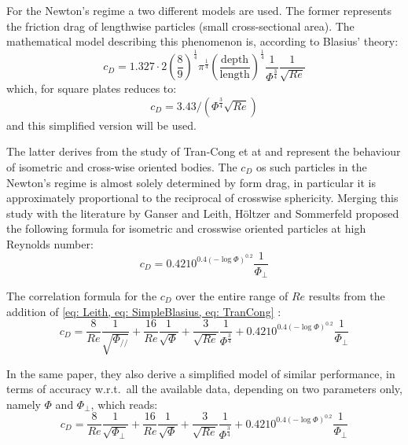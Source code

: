 		For the Newton's regime a two different models are used. The former
		represents the friction drag of lengthwise particles (small cross-sectional area). The mathematical model describing this phenomenon is, according to Blasius' theory:
		\begin{equation}
			c_D = 1.327 \cdot 2 \left(\frac{8}{9}\right)^{\frac{1}{4}} \pi^{\frac{1}{4}} \left(\frac{\text{depth}}{\text{length}}\right)^{\frac{1}{4}} \frac{1}{\Phi^{\frac{3}{4}}} \frac{1}{\sqrt{Re}}
			\label{eq: Blasius}
		\end{equation}
		which, for square plates reduces to:
		\begin{equation}
			c_D = 3.43 / (\Phi^{\frac{3}{4}} \sqrt{Re})
			\label{eq: SimpleBlasius}
		\end{equation}
		and this simplified version will be used.
		
		The latter derives from the study of Tran-Cong et at \cite{TranCongEtAl-2004} and represent the behaviour of isometric and cross-wise oriented bodies. The $ c_D $ os such particles in the Newton's regime is almost solely determined by form drag, in particular it is approximately proportional to the reciprocal of crosswise sphericity. Merging this study with the literature by Ganser and Leith, H\"{o}ltzer and Sommerfeld proposed the following formula for isometric and crosswise oriented particles at high Reynolds number:
		\begin{equation}
			c_D = 0.4210^{0.4(-\log \Phi)^{0.2}} \frac{1}{\Phi_{\perp}}
			\label{eq: TranCong}
		\end{equation}

		The correlation formula for the $ c_D $ over the entire range of $ Re  $ results from the addition of \cref{eq: Leith, eq: SimpleBlasius, eq: TranCong} :
		\begin{equation}
			c_D = \frac{8}{Re} \frac{1}{\sqrt{\Phi_{/\!/}}} 
			    + \frac{16}{Re} \frac{1}{\sqrt{\Phi}} 
			    + \frac{3}{\sqrt{Re}} \frac{1}{\Phi^{\frac{3}{4}}} 
			    + 0.4210^{0.4(-\log \Phi)^{0.2}} \frac{1}{\Phi_{\perp}}
			\label{eq: HS}
		\end{equation}
	
		In the same paper, they also derive a simplified model of similar performance, in terms of accuracy w.r.t.\ all the available data, depending on two parameters only, namely $\Phi$ and $\Phi_{\perp}$, which reads:
		\begin{equation}
			c_D = \frac{8}{Re} \frac{1}{\sqrt{\Phi_{\perp}}} 
			    + \frac{16}{Re} \frac{1}{\sqrt{\Phi}} 
			    + \frac{3}{\sqrt{Re}} \frac{1}{\Phi^{\frac{3}{4}}} 
			    + 0.4210^{0.4(-\log \Phi)^{0.2}} \frac{1}{\Phi_{\perp}}
			\label{eq: SimpleHS}
		\end{equation}
		
